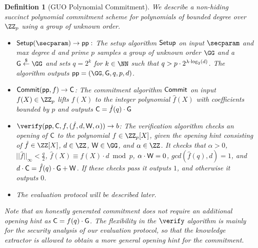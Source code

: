 \documentclass[12pt]{article}
\theoremstyle{Definition}
\newtheorem{definition}{Definition}
\begin{document}
\begin{definition}[GUO Polynomial Commitment]
We describe a non-hiding succinct polynomial commitment scheme for polynomials of bounded degree over $\ZZ_p$ using a group of unknown order.
\begin{itemize}
	\item $\setup(\secparam) \rightarrow \crs:$
The setup algorithm $\textsf{{Setup}}$ on input $\secparam$ and max degree $d$ and prime $p$ samples a group of unknown order $\GG$ and a $\Generator \sample \GG$ and sets $q=2^k$ for $k \in \NN$ such that $q>p\cdot 2^{\lambda \cdot \log_2(d)}$. The algorithm outputs $\crs=(\GG,\Generator,q,p,d)$.

\item $\textsf{{Commit}}(\textsf{pp}, f) \rightarrow \mathsf{C}$: The commitment algorithm $\textsf{{Commit}}$ on input $f(X)\in \ZZ_p$ lifts $f(X)$ to the integer polynomial $\hat{f}(X)$ with coefficients bounded by $p$ and outputs $\mathsf{C} =\hat{f}(q) \cdot \mathsf{G}$
\item $\verify(\crs, \Commitment, f, (\hat{f}, d,  \gr{W}, \alpha)) \rightarrow b$: 
The verification algorithm checks an opening of $\mathsf{C}$ to the polynomial $f \in \ZZ_p[X]$, given the opening hint consisting of $\hat{f}\in \ZZ[X]$, $d \in \ZZ$, $\gr{W} \in \GG$, and $\alpha \in \ZZ$. It checks that $\alpha > 0$, $||\hat{f}||_\infty < \frac{q}{2}$, $\hat{f}(X) \equiv f(X)\cdot d \bmod p$, $\alpha\cdot \mathsf{W}=0$, $gcd(\hat{f}(q), d) = 1$, and $d \cdot \mathsf{C} =\hat{f}(q)\cdot \mathsf{G} +\mathsf{W}$. If these checks pass it outputs $1$, and otherwise it outputs $0$. 
\item The evaluation protocol will be described later.
\end{itemize}
Note that an honestly generated commitment does not require an additional opening hint as $\mathsf{C} = f(q) \cdot \mathsf{G}$. The flexibility in the $\verify$ algorithm is mainly for the security analysis of our evaluation protocol, so that the knowledge extractor is allowed to obtain a more general opening hint for the commitment. 
\end{definition}
\end{document}
